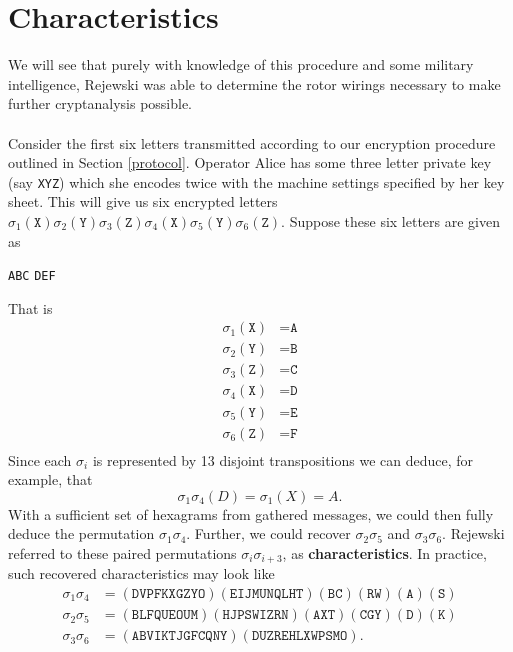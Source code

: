 \section{Characteristics}
We will see that purely with knowledge of this procedure and some
military intelligence, Rejewski was able to determine the rotor
wirings necessary to make further cryptanalysis possible.
\\\\Consider the first six letters transmitted according to our
encryption procedure outlined in Section \ref{protocol}. Operator Alice has
some three letter private
key (say \texttt{XYZ}) which she encodes twice with the machine
settings specified by her key sheet. This will give us six encrypted
letters
$\sigma_1(\texttt{X})\sigma_2(\texttt{Y})\sigma_3(\texttt{Z})\sigma_4(\texttt{X})\sigma_5(\texttt{Y})\sigma_6(\texttt{Z})$.
Suppose these six letters are given as
\begin{center}
  \texttt{ABC} \texttt{DEF}
\end{center}
That is
\begin{align*}
  \sigma_1(\texttt{X}) & = \texttt{A} \\
  \sigma_2(\texttt{Y}) & = \texttt{B} \\
  \sigma_3(\texttt{Z}) & = \texttt{C} \\
  \sigma_4(\texttt{X}) & = \texttt{D} \\
  \sigma_5(\texttt{Y}) & = \texttt{E} \\
  \sigma_6(\texttt{Z}) & = \texttt{F} \\
\end{align*}
Since each $\sigma_i$ is represented by 13 disjoint transpositions we
can deduce, for example, that
\[
  \sigma_1\sigma_4(D) = \sigma_1(X) = A.
\]
With a sufficient set of hexagrams from gathered messages, we could
then fully deduce the permutation $\sigma_1\sigma_4$. Further, we
could recover $\sigma_2\sigma_5$ and $\sigma_3\sigma_6$. Rejewski
referred to these paired permutations $\sigma_i\sigma_{i+3}$, as {\bf{characteristics}}. In
practice, such recovered characteristics may look like
\begin{align*}
  \sigma_1\sigma_4 & =
  (\texttt{DVPFKXGZYO})(\texttt{EIJMUNQLHT})(\texttt{BC})(\texttt{RW})(\texttt{A})(\texttt{S})
  \\
  \sigma_2\sigma_5 & =
  (\texttt{BLFQUEOUM})(\texttt{HJPSWIZRN})(\texttt{AXT})(\texttt{CGY})(\texttt{D})(\texttt{K})
  \\
  \sigma_3\sigma_6 & = (\texttt{ABVIKTJGFCQNY})(\texttt{DUZREHLXWPSMO}).
\end{align*}
